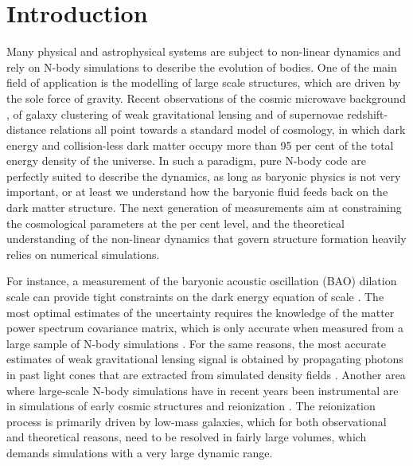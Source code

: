 \section{Introduction}

Many physical and astrophysical systems are subject to non-linear dynamics
and rely on N-body simulations to describe the evolution of bodies. 
One of the main field of application is the modelling of large scale structures, 
which are driven by the sole force of gravity. Recent observations of the 
cosmic microwave background \citep{2009ApJS..180..330K,2011ApJS..192...18K}, of galaxy clustering 
\citep{2000AJ....120.1579Y, 2003astro.ph..6581C, 2009arXiv0902.4680S, 
2010MNRAS.401.1429D} of weak gravitational lensing \citep{2012AAS...21913001H, 2009ApJ...703.2232S}
and of supernovae redshift-distance relations all point towards a standard 
model of cosmology, in which dark energy and collision-less dark matter occupy 
more than 95 per cent of the total energy density of the universe. In such a 
paradigm, pure N-body code are perfectly suited to describe the dynamics, as 
long as baryonic physics is not very important, or at least we understand how 
the baryonic fluid feeds back on the dark matter structure. The next generation 
of measurements aim at constraining the cosmological parameters at the per cent 
level, and the theoretical understanding of the non-linear dynamics that govern 
structure formation heavily relies on numerical simulations. 

For instance, a measurement of the baryonic acoustic oscillation (BAO) dilation 
scale can provide tight constraints on the dark energy equation of scale 
\citep{Eisenstein:2005su,2006PhRvD..74l3507T, 2007MNRAS.381.1053P,2009arXiv0902.4680S}. 
The most optimal estimates of the uncertainty requires the 
knowledge of the matter power spectrum covariance matrix, which is only accurate 
when measured from a large sample of N-body simulations \citep{2005MNRAS.360L..82R, 
2009ApJ...700..479T, 2011ApJ...726....7T}. For the same reasons, the most accurate 
estimates of weak gravitational lensing signal is obtained by propagating photons 
in past light cones that are extracted from simulated density fields 
\citep{2003ApJ...592..699V, 2009ApJ...701..945S, 2009A&A...499...31H}.
Another area where large-scale N-body simulations have in recent years been 
instrumental are in simulations of early cosmic structures and reionization 
\citep[e.g.][]{2006MNRAS.369.1625I,2007ApJ...654...12Z,2007ApJ...671....1T,
2011arXiv1107.4772I}. The reionization process is primarily driven by low-mass 
galaxies, which for both observational and theoretical reasons, need to be resolved 
in fairly large volumes, which demands simulations with a very large dynamic range.   

